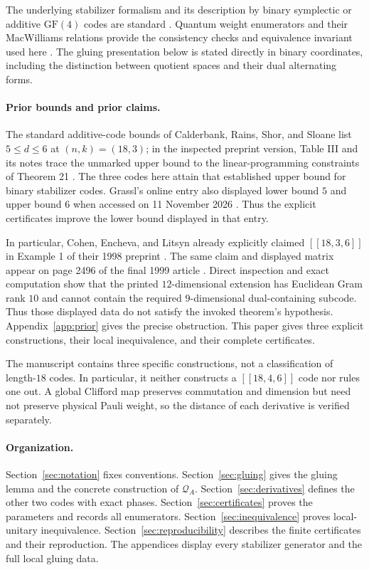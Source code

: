 \documentclass[11pt,a4paper]{article}
\newcommand{\CA}{\mathcal Q_A}
\begin{document}
The underlying stabilizer formalism and its description by binary symplectic or additive $\mathrm{GF}(4)$ codes are standard \cite{gottesman,calderbank}. Quantum weight enumerators and their MacWilliams relations provide the consistency checks and equivalence invariant used here \cite{shor-laflamme,rains}. The gluing presentation below is stated directly in binary coordinates, including the distinction between quotient spaces and their dual alternating forms.

\paragraph{Prior bounds and prior claims.}
The standard additive-code bounds of Calderbank, Rains, Shor, and Sloane list $5\le d\le6$ at $(n,k)=(18,3)$; in the inspected preprint version, Table III and its notes trace the unmarked upper bound to the linear-programming constraints of Theorem 21 \cite{calderbank}. The three codes here attain that established upper bound for binary stabilizer codes. Grassl's online entry also displayed lower bound $5$ and upper bound $6$ when accessed on 11 November 2026 \cite{GrasslTable183}. Thus the explicit certificates improve the lower bound displayed in that entry.

In particular, Cohen, Encheva, and Litsyn already explicitly claimed $[[18,3,6]]$ in Example 1 of their 1998 preprint \cite{CohenEnchevaLitsyn1998preprint}. The same claim and displayed matrix appear on page 2496 of the final 1999 article \cite{CohenEnchevaLitsyn1999}. Direct inspection and exact computation show that the printed $12$-dimensional extension has Euclidean Gram rank $10$ and cannot contain the required $9$-dimensional dual-containing subcode. Thus those displayed data do not satisfy the invoked theorem's hypothesis. Appendix~\ref{app:prior} gives the precise obstruction. This paper gives three explicit constructions, their local inequivalence, and their complete certificates.

The manuscript contains three specific constructions, not a classification of length-$18$ codes. In particular, it neither constructs a $[[18,4,6]]$ code nor rules one out. A global Clifford map preserves commutation and dimension but need not preserve physical Pauli weight, so the distance of each derivative is verified separately.

\paragraph{Organization.}
Section~\ref{sec:notation} fixes conventions. Section~\ref{sec:gluing} gives the gluing lemma and the concrete construction of $\CA$. Section~\ref{sec:derivatives} defines the other two codes with exact phases. Section~\ref{sec:certificates} proves the parameters and records all enumerators. Section~\ref{sec:inequivalence} proves local-unitary inequivalence. Section~\ref{sec:reproducibility} describes the finite certificates and their reproduction. The appendices display every stabilizer generator and the full local gluing data.
\end{document}
